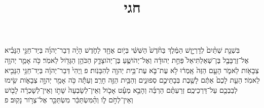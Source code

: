 \documentclass{openreader}
\title{חגי}
\date{}
\begin{document}
\maketitle
\raggedbottom 
\fontsize{16pt}{24pt}\selectfont


בִּשְׁנַ֤ת שְׁתַּ֨יִם֙ לְדָרְיָ֣וֶשׁ הַמֶּ֔לֶךְ בַּחֹ֨דֶשׁ֙ הַשִּׁשִּׁ֔י בְּיֹ֥ום אֶחָ֖ד לַחֹ֑דֶשׁ הָיָ֨ה דְבַר־יְהוָ֜ה בְּיַד־חַגַּ֣י הַנָּבִ֗יא אֶל־זְרֻבָּבֶ֤ל בֶּן־שְׁאַלְתִּיאֵל֙ פַּחַ֣ת יְהוּדָ֔ה וְאֶל־יְהֹושֻׁ֧עַ בֶּן־יְהֹוצָדָ֛ק הַכֹּהֵ֥ן הַגָּדֹ֖ול לֵאמֹֽר׃ 
כֹּ֥ה אָמַ֛ר יְהוָ֥ה צְבָאֹ֖ות לֵאמֹ֑ר הָעָ֤ם הַזֶּה֙ אָֽמְר֔וּ לֹ֥א עֶת־בֹּ֛א עֶת־בֵּ֥ית יְהוָ֖ה לְהִבָּנֹֽות׃ פ 
וַֽיְהִי֙ דְּבַר־יְהוָ֔ה בְּיַד־חַגַּ֥י הַנָּבִ֖יא לֵאמֹֽר׃ 
הַעֵ֤ת לָכֶם֙ אַתֶּ֔ם לָשֶׁ֖בֶת בְּבָתֵּיכֶ֣ם סְפוּנִ֑ים וְהַבַּ֥יִת הַזֶּ֖ה חָרֵֽב׃ 
וְעַתָּ֕ה כֹּ֥ה אָמַ֖ר יְהוָ֣ה צְבָאֹ֑ות שִׂ֥ימוּ לְבַבְכֶ֖ם עַל־דַּרְכֵיכֶֽם׃ 
זְרַעְתֶּ֨ם הַרְבֵּ֜ה וְהָבֵ֣א מְעָ֗ט אָכֹ֤ול וְאֵין־לְשָׂבְעָה֙ שָׁתֹ֣ו וְאֵין־לְשָׁכְרָ֔ה לָבֹ֖ושׁ וְאֵין־לְחֹ֣ם לֹ֑ו וְהַ֨מִּשְׂתַּכֵּ֔ר מִשְׂתַּכֵּ֖ר אֶל־צְרֹ֥ור נָקֽוּב׃ פ 
\end{document}
